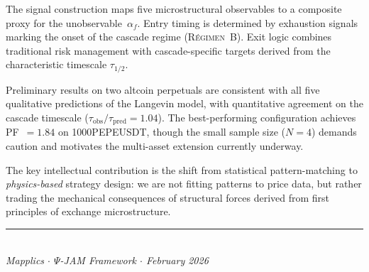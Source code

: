 \documentclass[11pt,a4paper]{article}
\newcommand{\af}{\alpha_f}
\newcommand{\regime}[1]{\textsc{R\'{e}gimen~#1}}
\begin{document}
The signal construction maps five microstructural observables to a composite 
proxy for the unobservable~$\af$. Entry timing is determined by exhaustion 
signals marking the onset of the cascade regime (\regime{B}). Exit logic 
combines traditional risk management with cascade-specific targets derived 
from the characteristic timescale $\tau_{1/2}$.

Preliminary results on two altcoin perpetuals are consistent with all five 
qualitative predictions of the Langevin model, with quantitative agreement on 
the cascade timescale ($\tau_{\mathrm{obs}}/\tau_{\mathrm{pred}} = 1.04$). 
The best-performing configuration achieves PF~$= 1.84$ on 1000PEPEUSDT, 
though the small sample size ($N = 4$) demands caution and motivates the 
multi-asset extension currently underway.

The key intellectual contribution is the shift from statistical 
pattern-matching to \emph{physics-based} strategy design: we are not fitting 
patterns to price data, but rather trading the mechanical consequences of 
structural forces derived from first principles of exchange microstructure.

\vfill
\begin{center}
\rule{0.5\textwidth}{0.4pt}\\[6pt]
{\small\itshape Mapplics $\cdot$ $\Psi$-JAM Framework $\cdot$ February 2026}
\end{center}
\end{document}
